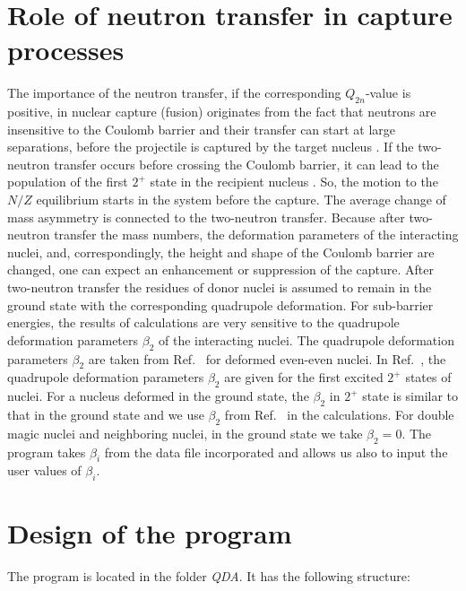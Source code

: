 \documentclass[preprint,review,12pt]{elsarticle}
\begin{document}
\section{Role of neutron transfer in capture processes}
  The importance of the neutron transfer, if the corresponding $Q_{2n}$-value is positive, in nuclear capture (fusion) originates from the fact
  that neutrons are insensitive to the Coulomb barrier and their transfer can start at large separations, before the
  projectile is captured by the target nucleus \cite{NashiTrs,Stelson,Broglia}.
  If the two-neutron transfer occurs before crossing the Coulomb barrier, it can lead to the population
  of the first $2^{+}$ state in the recipient nucleus \cite{Szilner}. So, the motion
  to the $N/Z$ equilibrium starts in the system before the capture.
  The average change of mass asymmetry is connected to the two-neutron transfer. Because after two-neutron transfer the
  mass numbers, the deformation parameters of the interacting nuclei, and, correspondingly, the height and shape of the
  Coulomb barrier are changed, one can expect an enhancement or suppression of the capture.
  After two-neutron transfer the residues of donor nuclei is assumed to remain in the
  ground state with the corresponding quadrupole deformation.
  For sub-barrier energies, the results of calculations are very
  sensitive to the quadrupole deformation parameters $\beta_2$ of the interacting nuclei. The quadrupole deformation parameters  $\beta_2$
  are taken from Ref.~\cite{Raman} for deformed even-even nuclei. In Ref.~\cite{Raman}, the quadrupole deformation parameters  $\beta_2$
  are given for the first excited $2^{+}$ states of nuclei. For a nucleus deformed
  in the ground state, the $\beta_2$  in $2^{+}$ state is similar to that in the ground state and we
  use $\beta_2$ from Ref.~\cite{Raman} in the calculations.
  For double magic nuclei and neighboring nuclei, in the ground state we take $\beta_2=0$. The program takes
  $\beta_i$ from the data file incorporated and allows
  us also to input the user values of $\beta_i$.


\section{Design of the program}
\label{sec:design}

  The program is located in the folder \textit{QDA}. It has the following structure:
\end{document}
